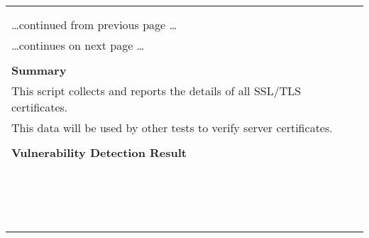 \documentclass{article}
\begin{document}
\begin{longtable}{|p{}|}
\hline
\rowcolor{gvm_log}{\color{white}{Log (CVSS: 0.0) }}\\
\rowcolor{gvm_log}{\color{white}{NVT: SSL/TLS: Collect and Report Certificate Details}}\\
\hline
\endfirsthead
\hfill\ldots continued from previous page \ldots \\
\hline
\endhead
\hline
\ldots continues on next page \ldots \\
\endfoot
\hline
\endlastfoot
\\
\textbf{Summary}\\
This script collects and reports the details of all SSL/TLS
  certificates.\\
  This data will be used by other tests to verify server certificates.\\

        \hline
        \\
\textbf{Vulnerability Detection Result}\\
\rowcolor{white}{\verb=The following certificate details of the remote service were collected.=}\\
\rowcolor{white}{\verb=Certificate details:=}\\
\rowcolor{white}{\verb=fingerprint (SHA-1)             | 3226C9FA80F051BF085C95D6CD2E9ABA43678A13=}\\
\rowcolor{white}{\verb=fingerprint (SHA-256)           | 5D729D2F60BF2E7DDFF4017044F790DD8D059211B05C9D=}\\
\rowcolor{white}{$\hookrightarrow$\verb=9D30CF6E6BEC791DB3=}\\
\rowcolor{white}{\verb=issued by                       | CN=\verb-=-\verb=dreamone,OU=\verb-=-\verb=STB,O=\verb-=-\verb=Dreambox,L=\verb-=-\verb=Home,ST=\verb-=-\verb=Home,C=}\\
\rowcolor{white}{$\hookrightarrow$\verb==\verb-=-\verb=DE=}\\
\rowcolor{white}{\verb=public key algorithm            | RSA=}\\
\rowcolor{white}{\verb=public key size (bits)          | 2048=}\\
\rowcolor{white}{\verb=serial                          | 2B95AD25=}\\
\rowcolor{white}{\verb=signature algorithm             | sha256WithRSAEncryption=}\\
\rowcolor{white}{\verb=subject                         | CN=\verb-=-\verb=dreamone,OU=\verb-=-\verb=STB,O=\verb-=-\verb=Dreambox,L=\verb-=-\verb=Home,ST=\verb-=-\verb=Home,C=}\\
\rowcolor{white}{$\hookrightarrow$\verb==\verb-=-\verb=DE=}\\
\rowcolor{white}{\verb=subject alternative names (SAN) | None=}\\
\rowcolor{white}{\verb=valid from                      | 2012-01-01 00:00:00 UTC=}\\
\rowcolor{white}{\verb=valid until                     | 2030-12-31 23:59:00 UTC=}\\


\end{longtable}
\end{document}
